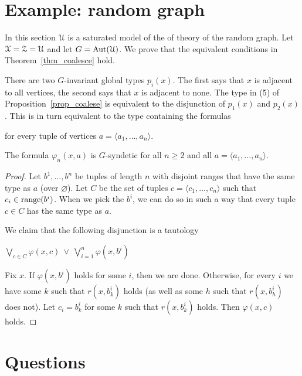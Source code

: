 \section{Example: random graph}

In this section $\EuScript U$ is a saturated model of the of theory of the random graph.
Let $\EuScript X=\EuScript Z=\EuScript U$ and let $G={\rm Aut}(\EuScript U)$.
We prove that the equivalent conditions in Theorem~\ref{thm_coalesce} hold.

There are two $G$-invariant global types $p_i(x)$.
The first says that $x$ is adjacent to all vertices, the second says that $x$ is adjacent to none.
The type in (5) of Proposition~\ref{prop_coalese} is equivalent to the disjunction of $p_1(x)$ and $p_2(x)$.
This is in turn equivalent to the type containing the formulas


for every tuple of vertices $a=\langle a_1,\dots,a_n\rangle$.

\begin{theorem}
  The formula $\varphi_n(x,a)$ is $G$-syndetic for all $n\ge 2$ and all $a=\langle a_1,\ldots,a_n\rangle$.
\end{theorem}

\begin{proof}
  Let $b^1,\ldots,b^n$ be tuples of length $n$ with disjoint ranges that have the same type as $a$ (over $\varnothing$). Let $C$ be the set of tuples $c=\langle c_1,\ldots,c_n\rangle$ such that $c_i\in{\rm range}(b^i)$.
  When we pick the $b^i$, we can do so in such a way that every tuple $c\in C$ has the same type as $a$.  

  We claim that the following disjunction is a tautology

  \hfil$\displaystyle\bigvee_{c\in C}\varphi(x,c)\ \vee\ \bigvee_{i=1}^n \varphi(x,b^i)$

  Fix $x$.
  If $\varphi(x,b^i)$ holds for some $i$, then we are done.
  Otherwise, for every $i$ we have some $k$ such that $r(x,b^i_k)$ holds (as well as some $h$ such that $r(x,b^i_h)$ does not).
  Let $c_i=b^i_k$ for some $k$ such that $r(x,b^i_k)$ holds.
  Then $\varphi(x,c)$ holds.
\end{proof}

\section{Questions}

